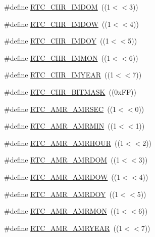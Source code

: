 \begin{DoxyCompactItemize}
\#define \hyperlink{group___r_t_c___private___macros_gaf55c5b7bf137cd55391e82b52a48fd12}{\-R\-T\-C\-\_\-\-C\-I\-I\-R\-\_\-\-I\-M\-D\-O\-M}~((1$<$$<$3))
\item 
\#define \hyperlink{group___r_t_c___private___macros_ga4a85d9ccd503abc66287eadfd7812279}{\-R\-T\-C\-\_\-\-C\-I\-I\-R\-\_\-\-I\-M\-D\-O\-W}~((1$<$$<$4))
\item 
\#define \hyperlink{group___r_t_c___private___macros_ga772e6a50392b61d1650f2372b31be99e}{\-R\-T\-C\-\_\-\-C\-I\-I\-R\-\_\-\-I\-M\-D\-O\-Y}~((1$<$$<$5))
\item 
\#define \hyperlink{group___r_t_c___private___macros_gad77a58f03fe563e76ebb88a7e662f814}{\-R\-T\-C\-\_\-\-C\-I\-I\-R\-\_\-\-I\-M\-M\-O\-N}~((1$<$$<$6))
\item 
\#define \hyperlink{group___r_t_c___private___macros_gace884731c6a8cbc67da8d6d3a460ea0b}{\-R\-T\-C\-\_\-\-C\-I\-I\-R\-\_\-\-I\-M\-Y\-E\-A\-R}~((1$<$$<$7))
\item 
\#define \hyperlink{group___r_t_c___private___macros_ga65b64f183d1f59e17341385cb6f540e5}{\-R\-T\-C\-\_\-\-C\-I\-I\-R\-\_\-\-B\-I\-T\-M\-A\-S\-K}~((0x\-F\-F))
\item 
\#define \hyperlink{group___r_t_c___private___macros_ga63765d3a556f4948a67cdce49e75f3c9}{\-R\-T\-C\-\_\-\-A\-M\-R\-\_\-\-A\-M\-R\-S\-E\-C}~((1$<$$<$0))
\item 
\#define \hyperlink{group___r_t_c___private___macros_ga39856f420fe75303c84236d5f8ae35ff}{\-R\-T\-C\-\_\-\-A\-M\-R\-\_\-\-A\-M\-R\-M\-I\-N}~((1$<$$<$1))
\item 
\#define \hyperlink{group___r_t_c___private___macros_ga746bb71b5ec4edb87e6f1d57a669454d}{\-R\-T\-C\-\_\-\-A\-M\-R\-\_\-\-A\-M\-R\-H\-O\-U\-R}~((1$<$$<$2))
\item 
\#define \hyperlink{group___r_t_c___private___macros_ga9f80d3076405906a1732aa27748e7a88}{\-R\-T\-C\-\_\-\-A\-M\-R\-\_\-\-A\-M\-R\-D\-O\-M}~((1$<$$<$3))
\item 
\#define \hyperlink{group___r_t_c___private___macros_gadd6ba0b814cad45a391307d0b0d612e0}{\-R\-T\-C\-\_\-\-A\-M\-R\-\_\-\-A\-M\-R\-D\-O\-W}~((1$<$$<$4))
\item 
\#define \hyperlink{group___r_t_c___private___macros_ga941c587216a505a651b46cfffc24e7ec}{\-R\-T\-C\-\_\-\-A\-M\-R\-\_\-\-A\-M\-R\-D\-O\-Y}~((1$<$$<$5))
\item 
\#define \hyperlink{group___r_t_c___private___macros_ga326738340b62ab2cd823ce290c2e5b3e}{\-R\-T\-C\-\_\-\-A\-M\-R\-\_\-\-A\-M\-R\-M\-O\-N}~((1$<$$<$6))
\item 
\#define \hyperlink{group___r_t_c___private___macros_ga68aeedc4bbe4df763e95020b49692fd8}{\-R\-T\-C\-\_\-\-A\-M\-R\-\_\-\-A\-M\-R\-Y\-E\-A\-R}~((1$<$$<$7))
$$
\end{DoxyCompactItemize}
